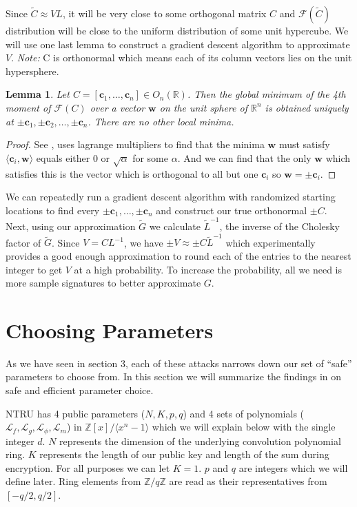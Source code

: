 \documentclass[12pt]{amsart}
\newtheorem{lemma}[theorem]{Lemma}
\theoremstyle{definition}
\theoremstyle{remark}
\newcommand{\R}{\mathbb{R}}
\newcommand{\Z}{\mathbb{Z}}
\begin{document}
Since $\widetilde{C} \approx VL$, it will be very close to some orthogonal matrix $C$ and $\mathcal{F}(\widetilde{C})$ distribution will be close to the uniform distribution of some unit hypercube. We will use one last lemma to construct a gradient descent algorithm to approximate $V$. \textit{Note:} C is orthonormal which means each of its column vectors lies on the unit hypersphere.

\begin{lemma}\label{lem:localMin}
Let $C = [\bm{c}_1,\dots,\bm{c}_n]\in O_n(\R)$. Then the global minimum of the 4th moment of $\mathcal{F}(C)$ over a vector $\bm{w}$ on the unit sphere of $\R^n$ is obtained uniquely at $\pm \bm{c}_1, \pm \bm{c}_2,\dots,\pm \bm{c}_n$. There are no other local minima.
\end{lemma}
\begin{proof}
    See \cite{LearningAttack}, uses lagrange multipliers to find that the minima $\bm{w}$ must satisfy $\langle \bm{c}_i, \bm{w} \rangle$ equals either 0 or $\sqrt{\alpha}$ for some $\alpha$. And we can find that the only $\bm{w}$ which satisfies this is the vector which is orthogonal to all but one $\bm{c}_i$ so $\bm{w}=\pm\bm{c}_i$.
\end{proof}

We can repeatedly run a gradient descent algorithm with randomized starting locations to find every $\pm\bm{c}_1,\dots,\pm\bm{c}_n$ and construct our true orthonormal $\pm C$. Next, using our approximation $\widetilde{G}$ we calculate $\widetilde{L}^{-1}$, the inverse of the Cholesky factor of $\widetilde{G}$. Since $V = CL^{-1}$, we have $\pm V \approx \pm C\widetilde{L}^{-1}$ which experimentally provides a good enough approximation to round each of the entries to the nearest integer to get $V$ at a high probability. To increase the probability, all we need is more sample signatures to better approximate $G$.

\section{Choosing Parameters}

    As we have seen in section 3, each of these attacks narrows down our set of ``safe'' parameters to choose from. In this section we will summarize the findings in \cite{NTRUpatent,ChosenCipherAttack,ManInMiddle,Parameters,NguyenThesis} on safe and efficient parameter choice.
    
    NTRU has 4 public parameters ($N,K,p,q$) and 4 sets of polynomials ($\mathscr{L}_f,\mathscr{L}_g,\mathscr{L}_\phi,\mathscr{L}_m$) in $\Z[x]/\langle x^n - 1\rangle $ which we will explain below with the single integer $d$. $N$ represents the dimension of the underlying convolution polynomial ring. $K$ represents the length of our public key and length of the sum during encryption. For all purposes we can let $K = 1$. $p$ and $q$ are integers which we will define later. Ring elements from $\Z/q\Z$ are read as their representatives from $[-q/2,q/2]$. 
    
\end{document}
